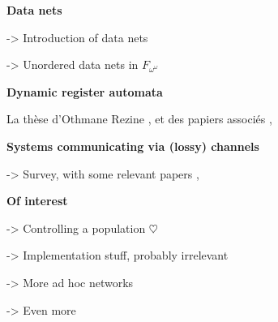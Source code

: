 	\textbf{Data nets}
	
	\cite{lazic2007nets} -> Introduction of data nets
	
	\cite{ROSAVELARDO201741} -> Unordered data nets in $F_{\omega^\omega}$
	
	\textbf{Dynamic register automata}
	
	La thèse d'Othmane Rezine \cite{Rezine2017verification}, et des papiers associés 
	\cite{AbdullaAKR2014verification},
	\cite{AbdullaAKR2015verification}
	
	\textbf{Systems communicating via (lossy) channels}
	
	\cite{Aiswarya2021network} -> Survey, with some relevant papers 	\cite{Aiswarya2015model},
	\cite{AbdullaAA2016data}
	
	\textbf{Of interest}
	
	\cite{BertrandDGGG2018controlling} -> Controlling a population $\heartsuit$
	
	\cite{baldoni2009implementing} -> Implementation stuff, probably irrelevant
	 	
	\cite{DelzannoSZ2011cliquesAdhoc} -> More ad hoc networks
	
	\cite{DBLP:journals/tcs/AbdullaDRST16} -> Even more
	
